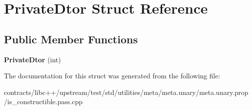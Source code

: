\hypertarget{struct_private_dtor}{}\section{Private\+Dtor Struct Reference}
\label{struct_private_dtor}
\subsection*{Public Member Functions}
\begin{DoxyCompactItemize}
\item 
\mbox{\label{struct_private_dtor_a57ef005e06c9bbba323dfcfb40b4aba8}} 
{\bfseries Private\+Dtor} (int)
\end{DoxyCompactItemize}


The documentation for this struct was generated from the following file\+:\begin{DoxyCompactItemize}
\item 
contracts/libc++/upstream/test/std/utilities/meta/meta.\+unary/meta.\+unary.\+prop/is\+\_\+constructible.\+pass.\+cpp\end{DoxyCompactItemize}

